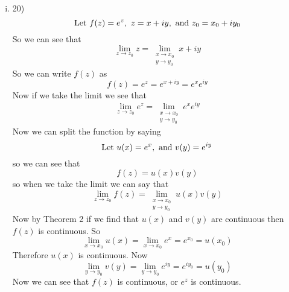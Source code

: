 \documentclass[11pt]{article}
\newcommand{\Let}{\textnormal{Let }}
\begin{document}
\begin{enumerate}
\begin{enumerate}[(i)]
\item 20)\\
$$\Let f(z) = e^z,\ z=x+iy,\ \textnormal{and }z_0 = x_0 +iy_0$$
So we can see that 
$$\lim_{z\rightarrow z_0} z = \lim_{\substack{x\rightarrow x_0\\y\rightarrow y_0}} x+iy$$
So we can write $f(z)$ as
$$f(z) = e^z = e^{x+iy} = e^{x}e^{iy}$$
Now if we take the limit we see that
$$\lim_{z\rightarrow z_0} e^z = \lim_{\substack{x\rightarrow x_0\\y\rightarrow y_0}} e^x e^{iy}$$
Now we can split the function by saying
$$\Let u(x) = e^x,\ \textnormal{and } v(y) = e^{iy}$$
so we can see that
$$f(z) = u(x)v(y)$$
so when we take the limit we can say that
$$\lim_{z\rightarrow z_0} f(z) = \lim_{\substack{x\rightarrow x_0\\y\rightarrow y_0}} u(x)v(y)$$
Now by Theorem 2 if we find that $u(x)$ and $v(y)$ are continuous then $f(z)$ is continuous. So
$$\lim_{x\rightarrow x_0} u(x) = \lim_{x\rightarrow x_0} e^x =e^{x_0} = u(x_0)$$
Therefore $u(x)$ is continuous. Now
$$\lim_{y\rightarrow y_0} v(y) = \lim_{y\rightarrow y_0} e^{iy} =e^{iy_0} = u(y_0)$$
Now we can see that $f(z)$ is continuous, or $e^z$ is continuous.
 
\end{enumerate}
\end{enumerate}
\end{document}
